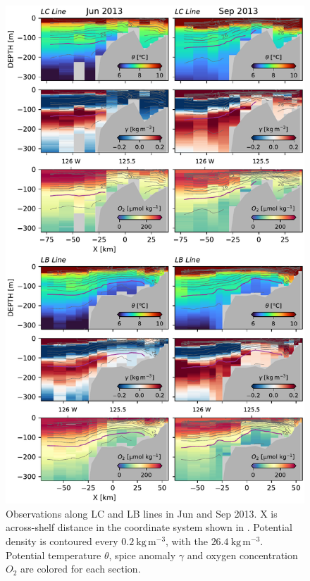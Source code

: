 \documentclass[draft]{agujournal2019}
\begin{document}
\begin{figure}[htbp]
  \begin{center}
     \includegraphics[width=130mm]{LaPerouse2013Ctd}
     \caption{Observations along LC and LB lines in Jun and Sep 2013.  X is across-shelf distance in the coordinate system shown in . Potential density is contoured every $0.2\ \mathrm{kg\,m^{-3}}$, with the $26.4\ \mathrm{kg\,m^{-3}}$.  Potential temperature $\theta$, spice anomaly $\gamma$ and oxygen concentration $O_2$ are colored for each section.}
     \label{fig:LaPerouse2013Ctd}
  \end{center}
\end{figure}
\end{document}
